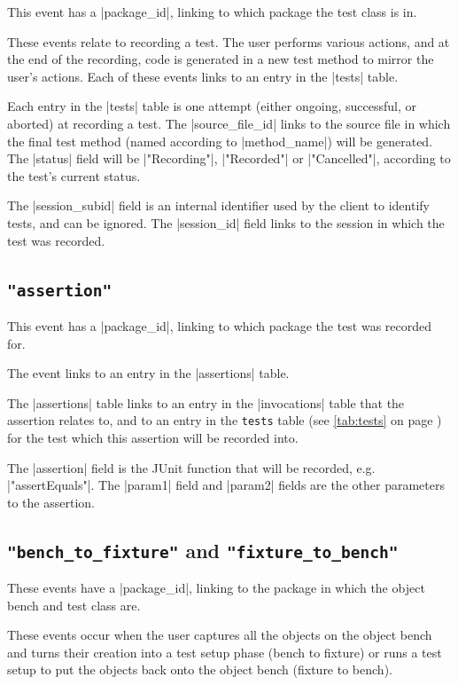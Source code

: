 \documentclass{report}
\newcommand{\myref}[1]{\autoref{#1} on page \pageref*{#1}}
\newcommand{\tabref}[1]{\lstinline|#1| table (see \myref{tab:#1})}
\begin{document}
This event has a |package_id|, linking to which package the test class
is in.

These events relate to recording a test.  The user performs various actions,
and at the end of the recording, code is generated in a new test method to
mirror the user's actions.  Each of these events links to an entry in the
|tests| table.


Each entry in the |tests| table is one attempt (either ongoing, successful, or
aborted) at recording a test.  The |source_file_id| links to the source file
in which the final test method (named according to |method_name|) will be
generated.  The |status| field will be |"Recording"|, |"Recorded"| or
|"Cancelled"|, according to the test's current status.

The |session_subid| field is an internal identifier used by the client to
identify tests, and can be ignored.  The |session_id| field links to the
session in which the test was recorded.

\subsection{\lstinline!"assertion"!}

This event has a |package_id|, linking to which package the test was
recorded for.

The event links to an entry in the |assertions| table.


The |assertions| table links to an entry in the |invocations| table that the assertion
relates to, and to an entry in the \tabref{tests} for the test which
this assertion will be recorded into.

The |assertion| field is the JUnit function that will be recorded,
e.g. |"assertEquals"|.  The |param1| field and |param2| fields are
the other parameters to the assertion.

\subsection{\lstinline!"bench_to_fixture"! and \lstinline!"fixture_to_bench"!}

These events have a |package_id|, linking to the package in which the object bench
and test class are.

These events occur when the user captures all the objects on the object bench
and turns their creation into a test setup phase (bench to fixture) or runs a
test setup to put the objects back onto the object bench (fixture to bench).
\end{document}
